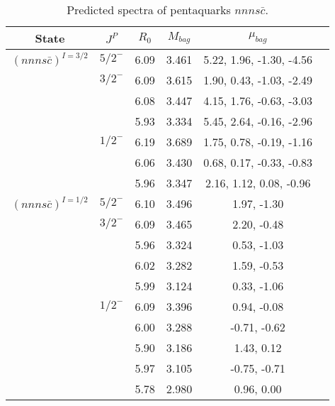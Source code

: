 \documentclass[prd,twocolumn,floatfix,nofootinbib]{revtex4}
\begin{document}
\renewcommand{\tabcolsep}{0.5cm}
\renewcommand{\arraystretch}{1.2}
\begin{table*}[!htbp]
    \caption{Predicted spectra of pentaquarks $nnns\bar{c}$.}
    \begin{tabular}{cccccc}
        \hline\hline
        {\rm State} &$J^{P}$ &$R_{0}$ &$M_{bag}$ &$\mu_{bag}$  \\ \hline
        ${(nnns\bar{c})}^{I=3/2}$
            &${5/2}^{-}$    &6.09   &3.461  &5.22, 1.96, -1.30, -4.56    \\
            &${3/2}^{-}$    &6.09   &3.615  &1.90, 0.43, -1.03, -2.49  \\
            &               &6.08   &3.447  &4.15, 1.76, -0.63, -3.03  \\
            &               &5.93   &3.334  &5.45, 2.64, -0.16, -2.96  \\
            &${1/2}^{-}$    &6.19   &3.689  &1.75, 0.78, -0.19, -1.16  \\
            &               &6.06   &3.430  &0.68, 0.17, -0.33, -0.83  \\
            &               &5.96   &3.347  &2.16, 1.12, 0.08, -0.96  \\
        ${(nnns\bar{c})}^{I=1/2}$
            &${5/2}^{-}$    &6.10   &3.496  &1.97, -1.30  \\
            &${3/2}^{-}$    &6.09   &3.465  &2.20, -0.48  \\
            &               &5.96   &3.324  &0.53, -1.03  \\
            &               &6.02   &3.282  &1.59, -0.53  \\
            &               &5.99   &3.124  &0.33, -1.06  \\
            &${1/2}^{-}$    &6.09   &3.396  &0.94, -0.08  \\
            &               &6.00   &3.288  &-0.71, -0.62  \\
            &               &5.90   &3.186  &1.43, 0.12  \\
            &               &5.97   &3.105  &-0.75, -0.71  \\
            &               &5.78   &2.980  &0.96, 0.00  \\
        \hline\hline
    \end{tabular}
\end{table*}
\end{document}
